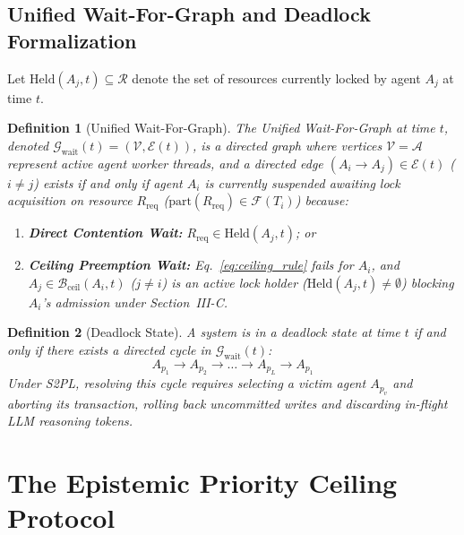 \documentclass[conference,10pt]{IEEEtran}
\newtheorem{definition}{Definition}
\begin{document}
\subsection{Unified Wait-For-Graph and Deadlock Formalization}
Let $\text{Held}(A_j, t) \subseteq \mathcal{R}$ denote the set of resources currently locked by agent $A_j$ at time $t$.

\begin{definition}[Unified Wait-For-Graph]
The Unified Wait-For-Graph at time $t$, denoted $\mathcal{G}_{\text{wait}}(t) = (\mathcal{V}, \mathcal{E}(t))$, is a directed graph where vertices $\mathcal{V} = \mathcal{A}$ represent active agent worker threads, and a directed edge $(A_i \to A_j) \in \mathcal{E}(t)$ ($i \ne j$) exists if and only if agent $A_i$ is currently suspended awaiting lock acquisition on resource $R_{\text{req}}$ ($\text{part}(R_{\text{req}}) \in \mathcal{F}(T_i)$) because:
\begin{enumerate}
    \item \textbf{Direct Contention Wait:} $R_{\text{req}} \in \text{Held}(A_j, t)$; or
    \item \textbf{Ceiling Preemption Wait:} Eq.~\eqref{eq:ceiling_rule} fails for $A_i$, and $A_j \in \mathcal{B}_{\text{ceil}}(A_i, t)$ ($j \ne i$) is an active lock holder ($\text{Held}(A_j, t) \ne \emptyset$) blocking $A_i$'s admission under Section~III-C.
\end{enumerate}
\end{definition}

\begin{definition}[Deadlock State]
A system is in a deadlock state at time $t$ if and only if there exists a directed cycle in $\mathcal{G}_{\text{wait}}(t)$:
\begin{equation}
A_{p_1} \to A_{p_2} \to \dots \to A_{p_L} \to A_{p_1}
\end{equation}
Under S2PL, resolving this cycle requires selecting a victim agent $A_{p_v}$ and aborting its transaction, rolling back uncommitted writes and discarding in-flight LLM reasoning tokens.
\end{definition}

\section{The Epistemic Priority Ceiling Protocol}
\end{document}
